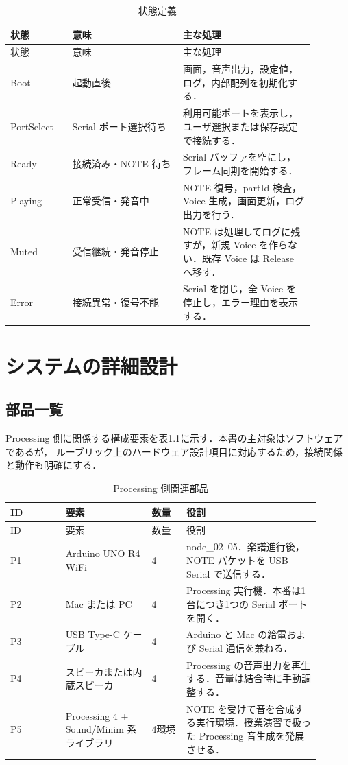\documentclass[lualatex,book,openany,paper=a4paper,jafontsize=11.5pt,jafontscale=1.05]{jlreq}
\begin{document}
\begin{longtable}{p{0.18\linewidth}p{0.32\linewidth}p{0.38\linewidth}}
\caption{状態定義}\label{tab:states}\\
\hline
状態 & 意味 & 主な処理 \\
\hline
\endfirsthead
\hline
状態 & 意味 & 主な処理 \\
\hline
\endhead
Boot & 起動直後 & 画面，音声出力，設定値，ログ，内部配列を初期化する． \\
\hline
PortSelect & Serial ポート選択待ち & 利用可能ポートを表示し，ユーザ選択または保存設定で接続する． \\
\hline
Ready & 接続済み・NOTE 待ち & Serial バッファを空にし，フレーム同期を開始する． \\
\hline
Playing & 正常受信・発音中 & NOTE 復号，partId 検査，Voice 生成，画面更新，ログ出力を行う． \\
\hline
Muted & 受信継続・発音停止 & NOTE は処理してログに残すが，新規 Voice を作らない．既存 Voice は Release へ移す． \\
\hline
Error & 接続異常・復号不能 & Serial を閉じ，全 Voice を停止し，エラー理由を表示する． \\
\hline
\end{longtable}

\chapter{システムの詳細設計}

\section{部品一覧}
Processing 側に関係する構成要素を表\ref{tab:parts}に示す．本書の主対象はソフトウェアであるが，
ルーブリック上のハードウェア設計項目に対応するため，接続関係と動作も明確にする．

\begin{longtable}{p{0.16\linewidth}p{0.25\linewidth}p{0.10\linewidth}p{0.39\linewidth}}
\caption{Processing 側関連部品}\label{tab:parts}\\
\hline
ID & 要素 & 数量 & 役割 \\
\hline
\endfirsthead
\hline
ID & 要素 & 数量 & 役割 \\
\hline
\endhead
P1 & Arduino UNO R4 WiFi & 4 & node\_02--05．楽譜進行後，NOTE パケットを USB Serial で送信する． \\
\hline
P2 & Mac または PC & 4 & Processing 実行機．本番は1台につき1つの Serial ポートを開く． \\
\hline
P3 & USB Type-C ケーブル & 4 & Arduino と Mac の給電および Serial 通信を兼ねる． \\
\hline
P4 & スピーカまたは内蔵スピーカ & 4 & Processing の音声出力を再生する．音量は結合時に手動調整する． \\
\hline
P5 & Processing 4 + Sound/Minim 系ライブラリ & 4環境 & NOTE を受けて音を合成する実行環境．授業演習で扱った Processing 音生成を発展させる． \\
\hline
\end{longtable}
\end{document}
